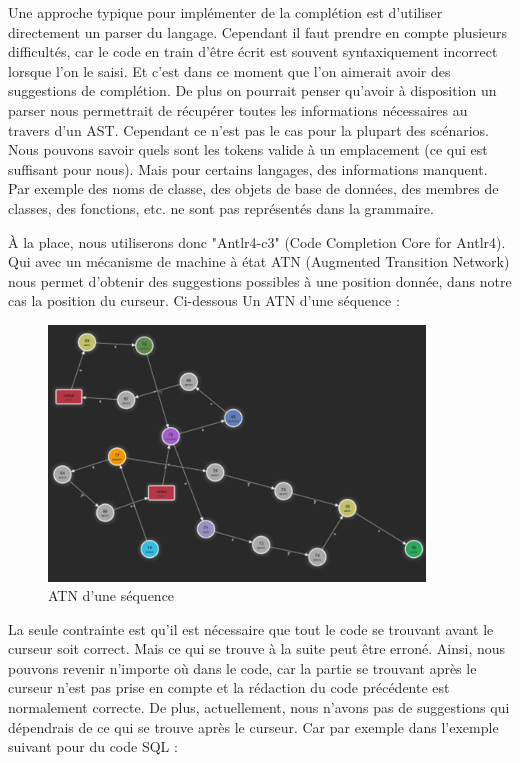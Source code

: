 \documentclass[
    iict, %
    il, %
]{heig-tb}
\begin{document}
Une approche typique pour implémenter de la complétion est d’utiliser directement un parser du langage.
Cependant il faut prendre en compte plusieurs difficultés, car le code en train d’être écrit est souvent syntaxiquement incorrect lorsque l’on le saisi.  Et c’est dans ce moment que l’on aimerait avoir des suggestions de complétion. 
De plus on pourrait penser qu’avoir à disposition un parser nous permettrait de récupérer toutes les informations nécessaires au travers d’un AST. Cependant ce n’est pas le cas pour la plupart des scénarios. Nous pouvons savoir quels sont les tokens valide à un emplacement (ce qui est suffisant pour nous). Mais pour certains langages, des informations manquent. Par exemple des noms de classe, des objets de base de données, des membres de classes, des fonctions, etc. ne sont pas représentés dans la grammaire. 

À la place, nous utiliserons donc "Antlr4-c3" (Code Completion Core for Antlr4). Qui avec un mécanisme de machine à état ATN (Augmented Transition Network) nous permet d’obtenir des suggestions possibles à une position donnée, dans notre cas la position du curseur.
Ci-dessous Un ATN d’une séquence :

\begin{figure}[!ht]
    \begin{center}
        \includegraphics[width=10cm]{assets/figures/seq_ATN.png}
    \end{center}
    \caption[ATN d'une séquence]{\label{seq_ATN} ATN d'une séquence}
\end{figure}

La seule contrainte est qu’il est nécessaire que tout le code se trouvant avant le curseur soit correct. Mais ce qui se trouve à la suite peut être erroné. 
Ainsi, nous pouvons revenir n’importe où dans le code, car la partie se trouvant après le curseur n’est pas prise en compte et la rédaction du code précédente est normalement correcte.
De plus, actuellement, nous n’avons pas de suggestions qui dépendrais de ce qui se trouve après le curseur.
Car par exemple dans l’exemple suivant pour du code SQL :
\end{document}
